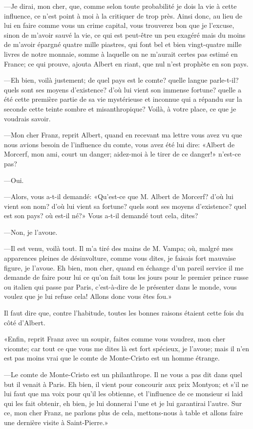 —Je dirai, mon cher, que, comme selon toute probabilité je dois la vie à cette influence, ce n'est point à moi à la critiquer de trop près. Ainsi donc, au lieu de lui en faire comme vous un crime capital, vous trouverez bon que je l'excuse, sinon de m'avoir sauvé la vie, ce qui est peut-être un peu exagéré mais du moins de m'avoir épargné quatre mille piastres, qui font bel et bien vingt-quatre mille livres de notre monnaie, somme à laquelle on ne m'aurait certes pas estimé en France; ce qui prouve, ajouta Albert en riant, que nul n'est prophète en son pays. 

—Eh bien, voilà justement; de quel pays est le comte? quelle langue parle-t-il? quels sont ses moyens d'existence? d'où lui vient son immense fortune? quelle a été cette première partie de sa vie mystérieuse et inconnue qui a répandu sur la seconde cette teinte sombre et misanthropique? Voilà, à votre place, ce que je voudrais savoir. 

—Mon cher Franz, reprit Albert, quand en recevant ma lettre vous avez vu que nous avions besoin de l'influence du comte, vous avez été lui dire: «Albert de Morcerf, mon ami, court un danger; aidez-moi à le tirer de ce danger!» n'est-ce pas? 

—Oui. 

—Alors, vous a-t-il demandé: «Qu'est-ce que M. Albert de Morcerf? d'où lui vient son nom? d'où lui vient sa fortune? quels sont ses moyens d'existence? quel est son pays? où est-il né?» Vous a-t-il demandé tout cela, dites? 

—Non, je l'avoue. 

—Il est venu, voilà tout. Il m'a tiré des mains de M. Vampa; où, malgré mes apparences pleines de désinvolture, comme vous dites, je faisais fort mauvaise figure, je l'avoue. Eh bien, mon cher, quand en échange d'un pareil service il me demande de faire pour lui ce qu'on fait tous les jours pour le premier prince russe ou italien qui passe par Paris, c'est-à-dire de le présenter dans le monde, vous voulez que je lui refuse cela! Allons donc vous êtes fou.» 

Il faut dire que, contre l'habitude, toutes les bonnes raisons étaient cette fois du côté d'Albert. 

«Enfin, reprit Franz avec un soupir, faites comme vous voudrez, mon cher vicomte; car tout ce que vous me dites là est fort spécieux, je l'avoue; mais il n'en est pas moins vrai que le comte de Monte-Cristo est un homme étrange. 

—Le comte de Monte-Cristo est un philanthrope. Il ne vous a pas dit dans quel but il venait à Paris. Eh bien, il vient pour concourir aux prix Montyon; et s'il ne lui faut que ma voix pour qu'il les obtienne, et l'influence de ce monsieur si laid qui les fait obtenir, eh bien, je lui donnerai l'une et je lui garantirai l'autre. Sur ce, mon cher Franz, ne parlons plus de cela, mettons-nous à table et allons faire une dernière visite à Saint-Pierre.» 

